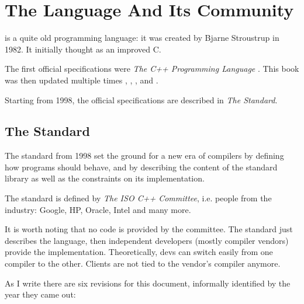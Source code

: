 \chapter{The \Cpp Language And Its Community}

\Cpp is a quite old programming language: it was created by Bjarne Stroustrup
in 1982. It initially thought as an improved C.

The first official specifications were \emph{The C++ Programming
  Language} \cite{the-cpp-programming-language-1st}. This book was
then updated multiple times \cite{the-cpp-programming-language-2nd},
\cite{the-cpp-programming-language-3rd},
\cite{the-cpp-programming-language-se}, and
\cite{the-cpp-programming-language-4th}.

Starting from 1998, the official specifications are described in
\emph{The Standard}.

\section{The Standard}

The standard from 1998 set the ground for a new era of compilers by
defining how \cpp{} programs should behave, and by describing the
content of the standard library as well as the constraints on its
implementation.

The standard is defined by {\em The ISO C++ Committee}, i.e. people
from the industry: Google, HP, Oracle, Intel and many more.

It is worth noting that no code is provided by the committee. The
standard just describes the language, then independent developers
(mostly compiler vendors) provide the implementation. Theoretically,
devs can switch easily from one compiler to the other. Clients are not
tied to the vendor's compiler anymore.

As I write there are six revisions for this document, informally
identified by the year they came out:

